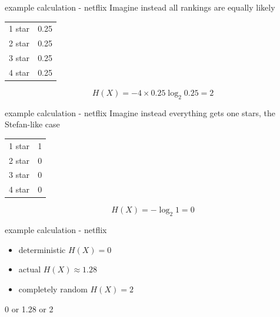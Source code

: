 \documentclass{beamer}
\newcommand{\crish}{\color{reddish}}
\newcommand{\cbla}{\color{black}}
\begin{document}
\begin{frame}{example calculation - netflix}
  Imagine instead all rankings are equally likely
    \begin{center}
    \begin{tabular}{l|l}
      \hline
      1 star&0.25\\
      2 star&0.25\\
      3 star&0.25\\
      4 star&0.25\\
      \hline
    \end{tabular}
  \end{center}
  \crish
  $$
H(X)=-4\times 0.25\log_2{0.25}=2
  $$
\cbla
\end{frame}  


\begin{frame}{example calculation - netflix}
  Imagine instead everything gets one stars, the Stefan-like case
    \begin{center}
    \begin{tabular}{l|l}
      \hline
      1 star&1\\
      2 star&0\\
      3 star&0\\
      4 star&0\\
      \hline
    \end{tabular}
  \end{center}
  \crish
  $$
H(X)=-\log_2{1}=0
  $$
\cbla
\end{frame}

\begin{frame}{example calculation - netflix}
  \begin{itemize}
  \item deterministic \crish $H(X)=0$\cbla
  \item actual \crish $H(X)\approx 1.28$\cbla
  \item completely random \crish $H(X)=2$\cbla
\end{itemize}
\end{frame}

\begin{frame}{0 or 1.28 or 2}
  \begin{center}
  \end{center}
\end{frame}
\end{document}
